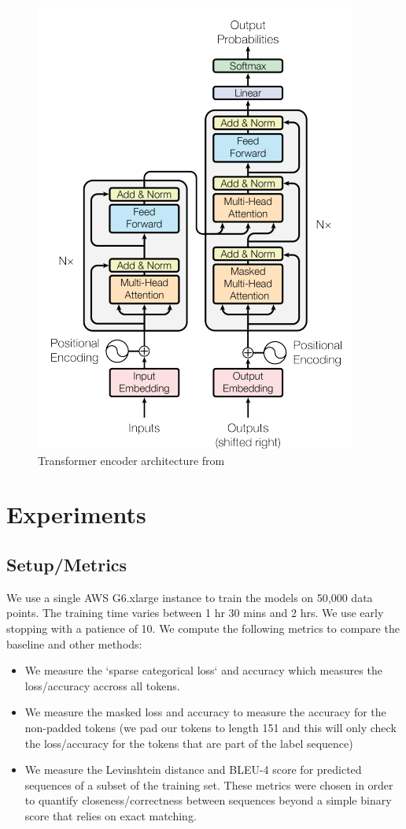 \documentclass{article}
\begin{document}
\begin{figure}[H]
	\centering \includegraphics[scale=0.5]{transformer_decoder.png}
	\caption{Transformer encoder architecture from \cite{transformer}}
\end{figure}


\section{Experiments}

\subsection{Setup/Metrics}

We use a single AWS G6.xlarge instance to train the models on 50,000 data points. The training time varies between  1 hr 30 mins and 2 hrs. We use early stopping with a patience of 10. We compute the following metrics to compare the baseline and other methods:

\begin{itemize}
  \item We measure the `sparse categorical loss` and accuracy which measures the loss/accuracy accross all tokens. 
  \item We measure the masked loss and accuracy to measure the accuracy for the non-padded tokens (we pad our tokens to length 151 and this will only check the loss/accuracy for the tokens that are part of the label sequence)
  \item We measure the Levinshtein distance and BLEU-4 score for predicted sequences of a subset of the training set. These metrics were chosen in order to quantify closeness/correctness between sequences beyond a simple binary score that relies on exact matching.
\end{itemize}
\end{document}
